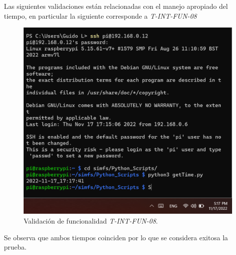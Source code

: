 %
%
Las siguientes validaciones están relacionadas con el manejo apropiado del tiempo, en particular la siguiente corresponde a \textit{T-INT-FUN-08}
\begin{figure}[H]
\centering
        	\includegraphics[width=\linewidth]{ImagenesValidacion del prototipo/TINTFUN8}
	\caption{Validación de funcionalidad \textit{T-INT-FUN-08}.}
\end{figure}
Se observa que ambos tiempos coinciden por lo que se considera exitosa la prueba.

